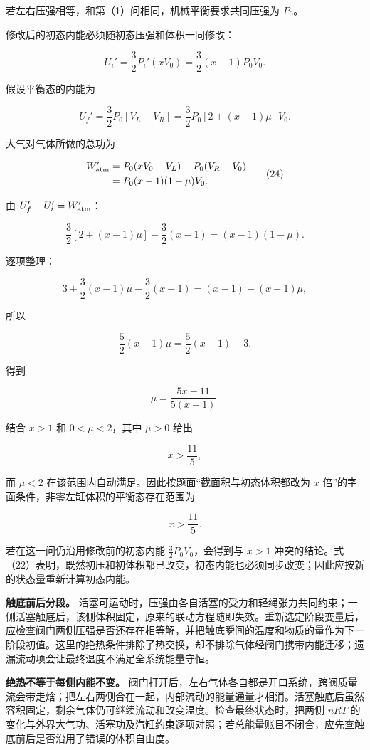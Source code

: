 \documentclass[12pt,a4paper,UTF8]{ctexart}
\begin{document}
若左右压强相等，和第（1）问相同，机械平衡要求共同压强为 \(P_0\)。

修改后的初态内能必须随初态压强和体积一同修改：

\[
U_i'
=\frac32P_i'(xV_0)
=\frac32(x-1)P_0V_0.
\tag{22}
\]

假设平衡态的内能为

\[
U_f'=\frac32P_0[V_L+V_R]
=\frac32P_0[2+(x-1)\mu]V_0.
\tag{23}
\]

大气对气体所做的总功为

\[
\begin{aligned}
W_{\rm atm}'
&=P_0(xV_0-V_L)-P_0(V_R-V_0)\\
&=P_0(x-1)(1-\mu)V_0.
\end{aligned}
\tag{24}
\]

由 \(U_f'-U_i'=W_{\rm atm}'\)：

\[
\frac32[2+(x-1)\mu]-\frac32(x-1)
=(x-1)(1-\mu).
\]

逐项整理：

\[
3+\frac32(x-1)\mu-\frac32(x-1)
=(x-1)-(x-1)\mu,
\]

所以

\[
\frac52(x-1)\mu=\frac52(x-1)-3.
\]

得到

\[
\boxed{\mu=\frac{5x-11}{5(x-1)}}.
\tag{25}
\]

结合 \(x>1\) 和 \(0<\mu<2\)，其中 \(\mu>0\) 给出

\[
x>\frac{11}{5},
\]

而 \(\mu<2\) 在该范围内自动满足。因此按题面``截面积与初态体积都改为
\(x\) 倍''的字面条件，非零左缸体积的平衡态存在范围为

\[
\boxed{x>\frac{11}{5}}.
\tag{26}
\]

若在这一问仍沿用修改前的初态内能 \(\frac32P_0V_0\)，会得到与 \(x>1\)
冲突的结论。式（22）表明，既然初压和初体积都已改变，初态内能也必须同步改变；因此应按新的状态量重新计算初态内能。

\textbf{触底前后分段。}
活塞可运动时，压强由各自活塞的受力和轻绳张力共同约束；一侧活塞触底后，该侧体积固定，原来的联动方程随即失效。重新选定阶段变量后，应检查阀门两侧压强是否还存在相等解，并把触底瞬间的温度和物质的量作为下一阶段初值。这里的绝热条件排除了热交换，却不排除气体经阀门携带内能迁移；遗漏流动项会让最终温度不满足全系统能量守恒。

\textbf{绝热不等于每侧内能不变。}
阀门打开后，左右气体各自都是开口系统，跨阀质量流会带走焓；把左右两侧合在一起，内部流动的能量通量才相消。活塞触底后虽然容积固定，剩余气体仍可继续流动和改变温度。检查最终状态时，把两侧
\(nRT\)
的变化与外界大气功、活塞功及汽缸约束逐项对照；若总能量账目不闭合，应先查触底前后是否沿用了错误的体积自由度。
\end{document}
